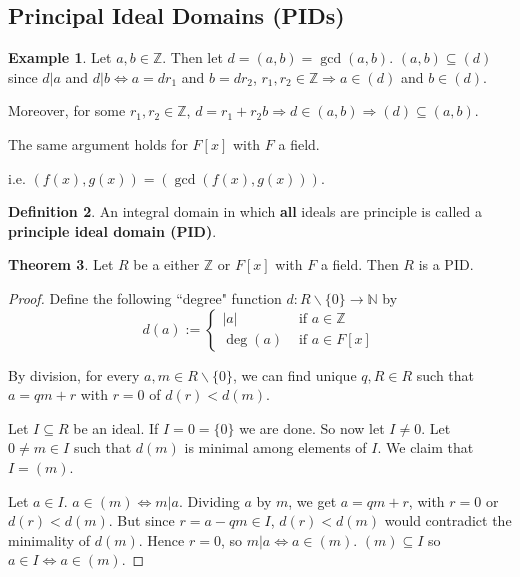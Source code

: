 \documentclass[12pt,a4paper]{article}
\theoremstyle{definition}
\newtheorem{definition}{Definition}[subsection]
\newtheorem{theorem}[definition]{Theorem}
\newtheorem{example}[definition]{Example}
\begin{document}
\subsection{Principal Ideal Domains (PIDs)}

\begin{example}
	Let $a, b \in \mathbb{Z}$. Then let $d = (a, b) = \gcd(a, b)$. $(a, b) \subseteq (d)$ since $d | a$ and $d | b \Leftrightarrow a = d r_1$ and $b = d r_2$, $r_1, r_2 \in \mathbb{Z} \Rightarrow a \in (d)$ and $b \in (d)$.

	Moreover, for some $r_1, r_2 \in \mathbb{Z}$, $d = r_1 + r_2 b \Rightarrow d \in (a, b) \Rightarrow (d) \subseteq (a, b)$.


	The same argument holds for $F[x]$ with $F$ a field.

	i.e. $(f(x), g(x)) = (\gcd(f(x), g(x)))$.
\end{example}

\begin{definition}
	An integral domain in which \textbf{all} ideals are principle is called a \textbf{principle ideal domain (PID)}.
\end{definition}

\begin{theorem}
	Let $R$ be a either $\mathbb{Z}$ or $F[x]$ with $F$ a field. Then $R$ is a PID.
\end{theorem}

\begin{proof}
	Define the following ``degree" function $d: R \backslash \{0\} \rightarrow \mathbb{N}$ by
	\[
		d(a) := \begin{cases}
			|a| & \text{ if } a \in \mathbb{Z} \\
			\deg(a) & \text{ if } a \in F[x]
		\end{cases}
	\]

	By division, for every $a, m \in R \backslash \{0\}$, we can find unique $q, R \in R$ such that $a = qm + r$ with $r = 0$ of $d(r) < d(m)$.

	Let $I \subseteq R$ be an ideal. If $I = 0 = \{0\}$ we are done. So now let $I \ne 0$. Let $0 \ne m \in I$ such that $d(m)$ is minimal among elements of $I$. We claim that $I = (m)$.

	Let $a \in I$. $a \in (m) \Leftrightarrow m | a$. Dividing $a$ by $m$, we get $a = qm + r$, with $r = 0$ or $d(r) < d(m)$. But since $r = a - qm \in I$, $d(r) < d(m)$ would contradict the minimality of $d(m)$. Hence $r = 0$, so $m | a \Leftrightarrow a \in (m)$. $(m) \subseteq I$ so $a \in I \Leftrightarrow a \in (m)$.
\end{proof}
\end{document}
